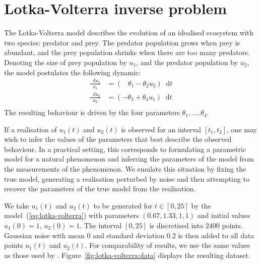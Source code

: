 \documentclass[11pt,a4paper]{report}
\newcommand*\diff{\mathop{}\!\mathrm{d}}
\begin{document}
\section{Lotka-Volterra inverse problem}

The Lotka-Volterra model describes the evolution of an idealised ecosystem with two species: predator and prey. The predator population grows when prey is abundant, and the prey population shrinks when there are too many predators. Denoting the size of prey population by $u_1$, and the predator population by $u_2$, the model postulates the following dynamic:
\begin{equation}
\begin{aligned}
\frac{\diff u_1}{u_1} & = ( \;\;\;\theta_1 - \theta_2 u_2 ) \diff t \\
\frac{\diff u_2}{u_2} & = ( -\theta_3 + \theta_4 u_1 ) \diff t \\
\end{aligned}
\label{eq:lotka-volterra}
\end{equation}
The resulting behaviour is driven by the four parameters $\theta_1, \dots, \theta_4$.

If a realisation of $u_1(t)$ and $u_2(t)$ is observed for an interval $[t_1, t_2]$, one may wish to infer the values of the parameters that best describe the observed behaviour. In a practical setting, this corresponds to formulating a parametric model for a natural phenomenon and inferring the parameters of the model from the measurements of the phenomenon. We emulate this situation by fixing the true model, generating a realisation perturbed by noise and then attempting to recover the parameters of the true model from the realisation.

We take $u_1(t)$ and $u_2(t)$ to be generated for $t \in [0, 25]$ by the model~(\ref{eq:lotka-volterra}) with parameters $(0.67, 1.33, 1, 1)$ and initial values $u_1(0) = 1$, $u_2(0) = 1$. The interval $[0, 25]$ is discretised into $2400$ points. Gaussian noise with mean 0 and standard deviation 0.2 is then added to all data points $u_1(t)$ and $u_2(t)$. For comparability of results, we use the same values as those used by \cite{riabizOptimalThinningMCMC2022}. Figure~\ref{fig:lotka-volterra:data} displays the resulting dataset.
\end{document}
